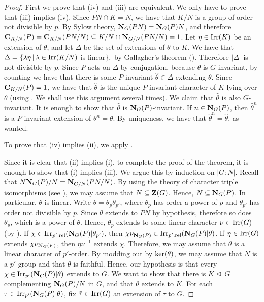 \documentclass[12pt]{amsart}
\theoremstyle{plain}
\theoremstyle{definition}
\numberwithin{equation}{section}
\def\irrp#1{{\rm Irr}_{p'}(#1)}
\def\irr#1{{\rm Irr}(#1)}
\def\cent#1#2{{\bf C}_{#1}(#2)}
\def\nor{\trianglelefteq\,}
\def\zent#1{{\bf Z}(#1)}
\def\ker#1{{\rm ker}(#1)}
\def\norm#1#2{{\bf N}_{#1}(#2)}
\def\sbs{\subseteq}
\begin{document}
\begin{proof}
First we prove that (iv) and (iii) are equivalent. We only have to
prove that (iii) implies (iv). Since $PN \cap K=N$, we have that
$K/N$ is a group of order not divisible by $p$. By Sylow theory,
$\norm G{PN}=\norm GP N$, and therefore
$\cent{K/N}P=\cent{K/N}{PN/N} \sbs K/N \cap \norm{G/N}{PN/N}=1$. Let
$\eta \in \irr K$ be an extension of $\theta$, and let $\Delta$ be
the set of extensions of $\theta$ to $K$. We have that
$\Delta=\{\lambda \eta \, |\, \lambda \in \irr{K/N}$ is linear$\},$
by Gallagher's theorem (\cite[Corollary 6.17]{Is}). Therefore
$|\Delta|$ is not divisible by $p$. Since $P$ acts on $\Delta$ by
conjugation, because $\theta$ is $G$-invariant, by counting we have
that there is some $P$-invariant $\hat\theta \in \Delta$ extending
$\theta$. Since $\cent{K/N}P=1$, we have that $\hat\theta$ is the
unique $P$-invariant character of $K$ lying over $\theta$
 (using \cite[Theorem 13.31 and Problem 13.10]{Is}. We shall use this argument
 several times).
 We
claim that $\hat\theta$ is also $G$-invariant. It is enough to show
that $\hat\theta$ is $\norm GP$-invariant. If $n \in \norm GP$, then
$\hat\theta^n$ is a $P$-invariant extension of $\theta^n=\theta$. By
uniqueness, we have that $\hat\theta^n=\hat\theta$, as wanted.


To prove that (iv) implies (ii), we apply \cite[Lemma 6.8(d)]{N}.


Since it is clear that (ii) implies (i), to complete the proof of
the theorem,
 it is enough to show that
(i) implies (iii). We argue this by induction on $|G:N|$. Recall
that $N\norm GP/N=\norm{G/N}{PN/N}$. By using the theory of
character triple isomorphisms (see \cite[Chapter 11]{Is}), we may
assume that $N\sbs \zent G$. Hence, $N\sbs \norm GP$.
In particular, $\theta$ is linear.
Write $\theta=\theta_p\theta_{p'}$, where $\theta_p$ has order a
power of $p$ and $\theta_{p'}$ has order not divisible by $p$.
 Since $\theta$ extends to $PN$ by hypothesis,   therefore
so does $\theta_p$, which is a power of $\theta$. Hence, $\theta_p$
extends to some linear character $\nu \in \irr G$ (by \cite[Theorem
6.26]{Is}).
If $\chi  \in {\rm Irr}_{p',{\rm rel}}(\norm GP|\theta_{p'})$,
then $\chi\nu_{\norm GP}
\in {\rm Irr}_{p',{\rm rel}}(\norm GP|\theta)$.
If $\eta \in \irr G$ extends $\chi\nu_{\norm GP}$, then $\eta \nu^{-1}$
extends $\chi$.  Therefore, we may assume that
$\theta$ is a linear character of $p'$-order. By modding out by
$\ker\theta$, we may assume that $N$ is a $p'$-group and that
$\theta$ is faithful. Hence, our hypothesis is that every $\chi \in
\irrp{\norm GP|\theta}$ extends to $G$.  We want to show that there
is $K \nor G$ complementing $\norm GP/N$ in $G$, and that  $\theta$
extends to $K$.  For each $\tau \in \irrp{\norm GP| \theta}$, fix
$\tilde\tau \in \irr{G}$ an extension of $\tau$ to $G$.


\end{proof}
\end{document}
